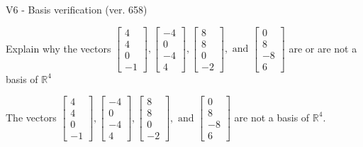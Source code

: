 \begin{exercise}
  \begin{exerciseTitle}V6 - Basis verification (ver. 658)\end{exerciseTitle}
  \begin{exerciseStatement}
    Explain why the vectors \(\left[\begin{array}{r}
4 \\
4 \\
0 \\
-1
\end{array}\right] , \left[\begin{array}{r}
-4 \\
0 \\
-4 \\
4
\end{array}\right] , \left[\begin{array}{r}
8 \\
8 \\
0 \\
-2
\end{array}\right] , \text{ and } \left[\begin{array}{r}
0 \\
8 \\
-8 \\
6
\end{array}\right]\) are or are not a basis of \(\mathbb{R}^4\)	


  \end{exerciseStatement}
  \begin{exerciseAnswer}
   The vectors \(\left[\begin{array}{r}
4 \\
4 \\
0 \\
-1
\end{array}\right] , \left[\begin{array}{r}
-4 \\
0 \\
-4 \\
4
\end{array}\right] , \left[\begin{array}{r}
8 \\
8 \\
0 \\
-2
\end{array}\right] , \text{ and } \left[\begin{array}{r}
0 \\
8 \\
-8 \\
6
\end{array}\right]\) 
  	 are not  a basis of \(\mathbb{R}^4\).
  


  \end{exerciseAnswer}
\end{exercise}